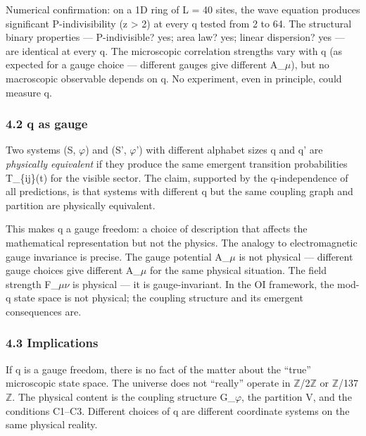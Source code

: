 \documentclass[
  11pt,
]{article}
\begin{document}
Numerical confirmation: on a 1D ring of L = 40 sites, the wave equation
produces significant P-indivisibility (z \textgreater{} 2) at every q
tested from 2 to 64. The structural binary properties --- P-indivisible?
yes; area law? yes; linear dispersion? yes --- are identical at every q.
The microscopic correlation strengths vary with q (as expected for a
gauge choice --- different gauges give different A\_\ensuremath{\mu}), but no
macroscopic observable depends on q. No experiment, even in principle,
could measure q.

\hypertarget{q-as-gauge}{%
\subsubsection{4.2 q as gauge}\label{q-as-gauge}}

Two systems (S, \ensuremath{\varphi}) and (S', \ensuremath{\varphi}') with different alphabet sizes q and q'
are \emph{physically equivalent} if they produce the same emergent
transition probabilities T\_\{ij\}(t) for the visible sector. The claim,
supported by the q-independence of all predictions, is that systems with
different q but the same coupling graph and partition are physically
equivalent.

This makes q a gauge freedom: a choice of description that affects the
mathematical representation but not the physics. The analogy to
electromagnetic gauge invariance is precise. The gauge potential A\_\ensuremath{\mu} is
not physical --- different gauge choices give different A\_\ensuremath{\mu} for the
same physical situation. The field strength F\_\ensuremath{\mu}\ensuremath{\nu} is physical --- it is
gauge-invariant. In the OI framework, the mod-q state space is not
physical; the coupling structure and its emergent consequences are.

\hypertarget{implications}{%
\subsubsection{4.3 Implications}\label{implications}}

If q is a gauge freedom, there is no fact of the matter about the
``true'' microscopic state space. The universe does not ``really''
operate in \ensuremath{\mathbb{Z}}/2\ensuremath{\mathbb{Z}} or \ensuremath{\mathbb{Z}}/137\ensuremath{\mathbb{Z}}. The physical content is the coupling
structure G\_\ensuremath{\varphi}, the partition V, and the conditions C1--C3. Different
choices of q are different coordinate systems on the same physical
reality.
\end{document}
